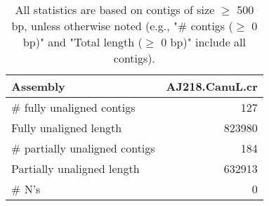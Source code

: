 \documentclass[12pt,a4paper]{article}
\begin{document}
\begin{table}[ht]
\begin{center}
\caption{All statistics are based on contigs of size $\geq$ 500 bp, unless otherwise noted (e.g., "\# contigs ($\geq$ 0 bp)" and "Total length ($\geq$ 0 bp)" include all contigs).}
\begin{tabular}{|l*{1}{|r}|}
\hline
Assembly & AJ218.CanuL.cr \\ \hline
\# fully unaligned contigs & 127 \\ \hline
Fully unaligned length & 823980 \\ \hline
\# partially unaligned contigs & 184 \\ \hline
Partially unaligned length & 632913 \\ \hline
\# N's & 0 \\ \hline
\end{tabular}
\end{center}
\end{table}
\end{document}
